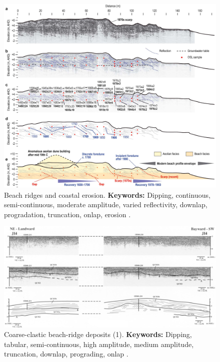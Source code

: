 \begin{landscape}
\begin{figure}[h!]
    \centering
    \includegraphics[width=0.75\linewidth]{Figures/0.2GPR/Tamura_2019_BR_Coast_er_1.png}
    \caption[Beach ridges and coastal erosion.]{Beach ridges and coastal erosion. \textbf{Keywords: } Dipping, continuous, semi-continuous, moderate amplitude, varied reflectivity, downlap, progradation, truncation, onlap, erosion \citep{Tamura2019}.}
    \label{fig:Tamura2019-1}
\end{figure}
\end{landscape}

\begin{landscape}
\begin{figure}[h!]
    \centering
    \includegraphics[width=0.9\linewidth]{Figures/0.2GPR/neal2003_1.png}
    \caption[Coarse-clastic beach-ridge deposits (1).]{Coarse-clastic beach-ridge deposits (1). \textbf{Keywords: } Dipping, tabular, semi-continuous, high amplitude, medium amplitude, truncation, downlap, prograding, onlap \citep{Neal2003}.}
    \label{fig:Neal2003-1}
\end{figure}
\end{landscape}

